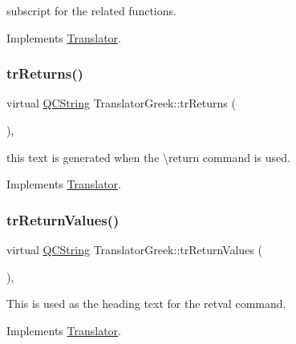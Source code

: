 subscript for the related functions. 

Implements \mbox{\hyperlink{class_translator}{Translator}}.

\mbox{\label{class_translator_greek_a8b6770f55ba967c94cfcc1060dfa1dc3}} 
\subsubsection{\texorpdfstring{trReturns()}{trReturns()}}
{\footnotesize\ttfamily virtual \mbox{\hyperlink{class_q_c_string}{Q\+C\+String}} Translator\+Greek\+::tr\+Returns (\begin{DoxyParamCaption}{ }\end{DoxyParamCaption})\hspace{0.3cm}{\ttfamily [inline]}, {\ttfamily [virtual]}}

this text is generated when the \textbackslash{}return command is used. 

Implements \mbox{\hyperlink{class_translator}{Translator}}.

\mbox{\label{class_translator_greek_ad1259d069425e4f8ce5126966b31f447}} 
\subsubsection{\texorpdfstring{trReturnValues()}{trReturnValues()}}
{\footnotesize\ttfamily virtual \mbox{\hyperlink{class_q_c_string}{Q\+C\+String}} Translator\+Greek\+::tr\+Return\+Values (\begin{DoxyParamCaption}{ }\end{DoxyParamCaption})\hspace{0.3cm}{\ttfamily [inline]}, {\ttfamily [virtual]}}

This is used as the heading text for the retval command. 

Implements \mbox{\hyperlink{class_translator}{Translator}}.

\mbox{\label{class_translator_greek_a61f354a3621da4c121345eae8b2846e4}} 
